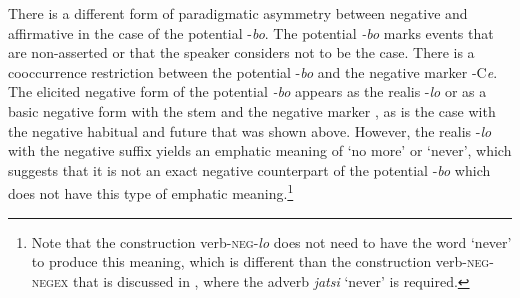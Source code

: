 \documentclass[output=paper,colorlinks,citecolor=brown]{langscibook}
\begin{document}
There is a different form of paradigmatic asymmetry between negative and affirmative in the case of the potential -\textit{bo}. The potential \textit{{}-bo} marks events that are non-asserted or that the speaker considers not to be the case. There is a cooccurrence restriction between the potential -\textit{bo} and the negative marker -C\textit{e}. The elicited negative form of the potential \textit{{}-bo} appears as the realis -\textit{lo} or as a basic negative form with the stem and the negative marker , as is the case with the negative habitual and future that was shown above. However, the realis -\textit{lo} with the negative suffix yields an emphatic meaning of ‘no more’ or ‘never’, which suggests that it is not an exact negative counterpart of the potential -\textit{bo} which does not have this type of emphatic meaning.\footnote{Note that the construction verb-\textsc{neg}{}-\textit{lo} does not need to have the word ‘never’ to produce this meaning, which is different than the construction verb-\textsc{neg}{}-\textsc{negex} that is discussed in , where the adverb \textit{jatsi} ‘never’ is required.} 

\end{document}

